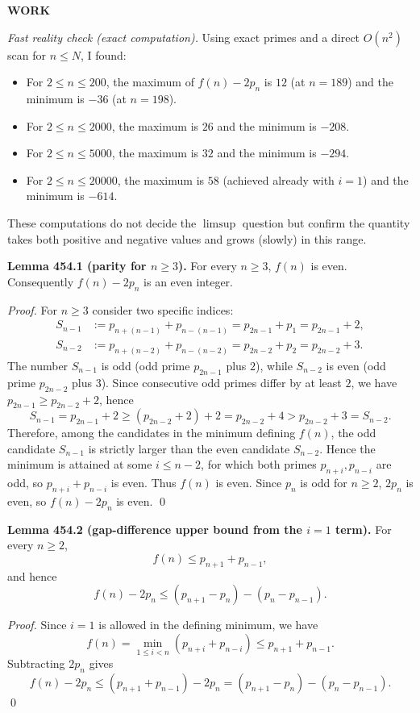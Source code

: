 \textbf{WORK}

\emph{Fast reality check (exact computation).}
Using exact primes and a direct $O(n^2)$ scan for $n\le N$, I found:
\begin{itemize}
\item For $2\le n\le 200$, the maximum of $f(n)-2p_n$ is $12$ (at $n=189$) and the minimum is $-36$ (at $n=198$).
\item For $2\le n\le 2000$, the maximum is $26$ and the minimum is $-208$.
\item For $2\le n\le 5000$, the maximum is $32$ and the minimum is $-294$.
\item For $2\le n\le 20000$, the maximum is $58$ (achieved already with $i=1$) and the minimum is $-614$.
\end{itemize}
These computations do not decide the $\limsup$ question but confirm the quantity takes both positive and negative values and grows (slowly) in this range.

\medskip

\textbf{Lemma 454.1 (parity for $n\ge 3$).}
For every $n\ge 3$, $f(n)$ is even. Consequently $f(n)-2p_n$ is an even integer.

\emph{Proof.}
For $n\ge 3$ consider two specific indices:
\begin{align*}
S_{n-1}&:=p_{n+(n-1)}+p_{n-(n-1)}=p_{2n-1}+p_1=p_{2n-1}+2,\\
S_{n-2}&:=p_{n+(n-2)}+p_{n-(n-2)}=p_{2n-2}+p_2=p_{2n-2}+3.
\end{align*}
The number $S_{n-1}$ is odd (odd prime $p_{2n-1}$ plus $2$), while $S_{n-2}$ is even (odd prime $p_{2n-2}$ plus $3$).
Since consecutive odd primes differ by at least $2$, we have $p_{2n-1}\ge p_{2n-2}+2$, hence
\[
S_{n-1}=p_{2n-1}+2\ge (p_{2n-2}+2)+2=p_{2n-2}+4>p_{2n-2}+3=S_{n-2}.
\]
Therefore, among the candidates in the minimum defining $f(n)$, the odd candidate $S_{n-1}$ is strictly larger than the even candidate $S_{n-2}$. Hence the minimum is attained at some $i\le n-2$, for which both primes $p_{n+i},p_{n-i}$ are odd, so $p_{n+i}+p_{n-i}$ is even. Thus $f(n)$ is even.
Since $p_n$ is odd for $n\ge 2$, $2p_n$ is even, so $f(n)-2p_n$ is even.
\qed

\medskip

\textbf{Lemma 454.2 (gap-difference upper bound from the $i=1$ term).}
For every $n\ge 2$,
\[
 f(n)\le p_{n+1}+p_{n-1},
\]
and hence
\[
 f(n)-2p_n\le (p_{n+1}-p_n)-(p_n-p_{n-1}).
\]

\emph{Proof.}
Since $i=1$ is allowed in the defining minimum, we have
\[
 f(n)=\min_{1\le i<n}(p_{n+i}+p_{n-i})\le p_{n+1}+p_{n-1}.
\]
Subtracting $2p_n$ gives
\[
 f(n)-2p_n\le (p_{n+1}+p_{n-1})-2p_n=(p_{n+1}-p_n)-(p_n-p_{n-1}).
\]
\qed

